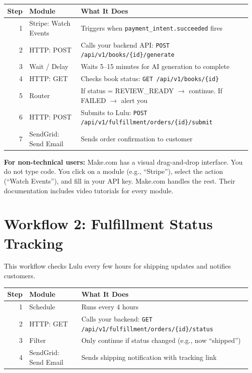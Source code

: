 \documentclass[12pt, letterpaper, oneside]{book}
\begin{document}
\begin{table}[H]
\centering
\small
\begin{tabularx}{\textwidth}{rlX}
\toprule
\textbf{Step} & \textbf{Module} & \textbf{What It Does} \\
\midrule
1 & Stripe: Watch Events & Triggers when \texttt{payment\_intent.succeeded} fires \\
2 & HTTP: POST & Calls your backend API: \texttt{POST /api/v1/books/\{id\}/generate} \\
3 & Wait / Delay & Waits 5--15 minutes for AI generation to complete \\
4 & HTTP: GET & Checks book status: \texttt{GET /api/v1/books/\{id\}} \\
5 & Router & If status = REVIEW\_READY $\rightarrow$ continue. If FAILED $\rightarrow$ alert you \\
6 & HTTP: POST & Submits to Lulu: \texttt{POST /api/v1/fulfillment/orders/\{id\}/submit} \\
7 & SendGrid: Send Email & Sends order confirmation to customer \\
\bottomrule
\end{tabularx}
\end{table}

\begin{infobox}
\textbf{For non-technical users:} Make.com has a visual drag-and-drop interface. You do not type code. You click on a module (e.g., ``Stripe''), select the action (``Watch Events''), and fill in your API key. Make.com handles the rest. Their documentation includes video tutorials for every module.
\end{infobox}

\section{Workflow 2: Fulfillment Status Tracking}

This workflow checks Lulu every few hours for shipping updates and notifies customers.

\begin{table}[H]
\centering
\small
\begin{tabularx}{\textwidth}{rlX}
\toprule
\textbf{Step} & \textbf{Module} & \textbf{What It Does} \\
\midrule
1 & Schedule & Runs every 4 hours \\
2 & HTTP: GET & Calls your backend: \texttt{GET /api/v1/fulfillment/orders/\{id\}/status} \\
3 & Filter & Only continue if status changed (e.g., now ``shipped'') \\
4 & SendGrid: Send Email & Sends shipping notification with tracking link \\
\bottomrule
\end{tabularx}
\end{table}
\end{document}
